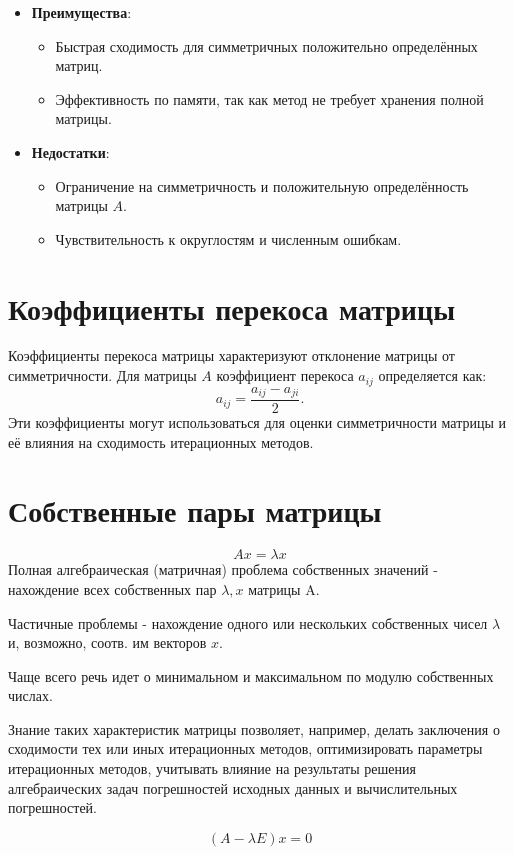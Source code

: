 \documentclass{article}
\begin{document}
\begin{itemize}
    \item \textbf{Преимущества}:
    \begin{itemize}
        \item Быстрая сходимость для симметричных положительно определённых матриц.
        \item Эффективность по памяти, так как метод не требует хранения полной матрицы.
    \end{itemize}
    \item \textbf{Недостатки}:
    \begin{itemize}
        \item Ограничение на симметричность и положительную определённость матрицы \(A\).
        \item Чувствительность к округлостям и численным ошибкам.
    \end{itemize}
\end{itemize}

\section{Коэффициенты перекоса матрицы}
Коэффициенты перекоса матрицы характеризуют отклонение матрицы от симметричности. Для матрицы $A$ коэффициент перекоса $a_{ij}$ определяется как:
\[
a_{ij} = \frac{a_{ij} - a_{ji}}{2}.
\]
Эти коэффициенты могут использоваться для оценки симметричности матрицы и её влияния на сходимость итерационных методов.

\section*{Собственные пары матрицы}
$$Ax = \lambda x$$
Полная алгебраическая (матричная) проблема собственных значений - нахождение всех собственных пар ${\lambda, x}$ матрицы A.

Частичные проблемы - нахождение одного или нескольких собственных чисел $\lambda$ и, возможно, соотв. им векторов $x$.

Чаще всего речь идет о минимальном и максимальном по модулю собственных числах.

Знание таких характеристик матрицы позволяет,  
например, делать заключения о сходимости тех или иных итерационных  
методов, оптимизировать параметры итерационных методов, учитывать 
влияние на результаты решения алгебраических задач погрешностей  
исходных данных и вычислительных погрешностей.

$$(A - \lambda E) x = 0$$
\end{document}
